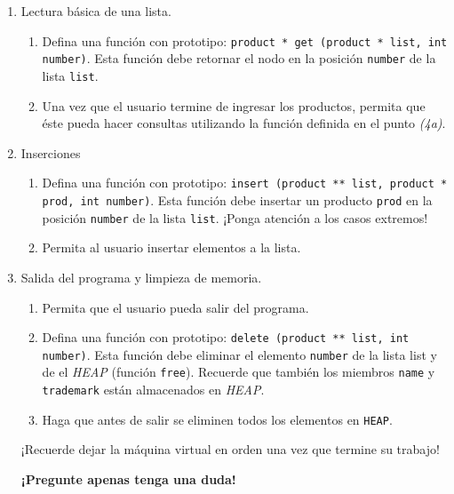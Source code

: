 \documentclass[letterpaper,10pt]{article}
\begin{document}
\begin{enumerate}
  \item Lectura básica de una lista.
  \begin{enumerate}
    \item Defina una función con prototipo: \texttt{product * get (product * list, int number)}. Esta función debe retornar el nodo en la posición
	  \texttt{number} de la lista \texttt{list}.
    \item Una vez que el usuario termine de ingresar los productos, permita que éste pueda hacer consultas utilizando la función definida en
	  el punto \textsl{(4a)}.
  \end{enumerate}

  \item Inserciones
  \begin{enumerate}
    \item Defina una función con prototipo: \texttt{insert (product ** list, product * prod, int number)}. Esta función debe insertar un producto
	  \texttt{prod} en la posición \texttt{number} de la lista \texttt{list}. ¡Ponga atención a los casos extremos!
    \item Permita al usuario insertar elementos a la lista.
  \end{enumerate}

  \item Salida del programa y limpieza de memoria.
  \begin{enumerate}
    \item Permita que el usuario pueda salir del programa.
    \item Defina una función con prototipo: \texttt{delete (product ** list, int number)}. Esta función debe eliminar el elemento \texttt{number}
	  de la lista list y de el \textit{HEAP} (función \texttt{free}). Recuerde que también los miembros \texttt{name} y \texttt{trademark}
	  están almacenados en \textit{HEAP}.
    \item Haga que antes de salir se eliminen todos los elementos en \texttt{HEAP}.
  \end{enumerate}

  ¡Recuerde dejar la máquina virtual en orden una vez que termine su trabajo!
  
  \textbf{¡Pregunte apenas tenga una duda!}


\end{enumerate}
\end{document}
